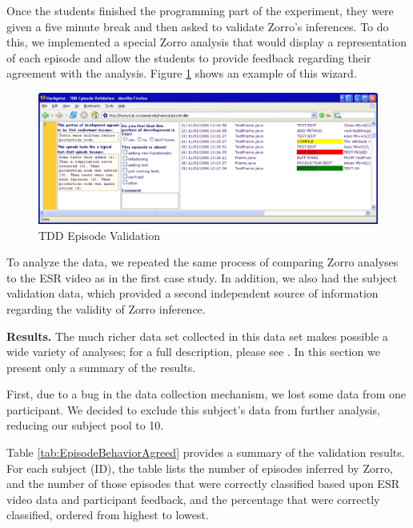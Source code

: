 \documentclass[smallextended]{svjour3}     %
\begin{document}
Once the students finished the programming part of the experiment, they
were given a five minute break and then asked to validate Zorro's
inferences.  To do this, we implemented a special Zorro analysis that would
display a representation of each episode and allow the students to provide
feedback regarding their agreement with the analysis.  Figure
\ref{fig:EpisodeFeedback} shows an example of this wizard.

\begin{figure}[htbp]
  \centering
  \includegraphics[width=1.0\textwidth]{EpisodeFeedback}
  \caption{TDD Episode Validation}\label{fig:EpisodeFeedback}
\end{figure}

To analyze the data, we repeated the same process of comparing Zorro analyses to the ESR video as in the first case study.  In addition, we also had the subject validation data, which provided a second independent source of information regarding the validity of Zorro inference.  

{\bf Results.}  The much richer data set collected in this data set makes possible a wide variety of analyses; for a full description, please see \cite{csdl2-07-04}.  In this section we present only a summary of the results. 

First, due to a bug in the data collection mechanism, we lost some data
from one participant. We decided to exclude this subject's data from further analysis, reducing our subject pool to 10. 


Table \ref{tab:EpisodeBehaviorAgreed} provides a summary of the validation results. For each subject (ID), the table lists the number of episodes inferred by Zorro, and the number of those episodes that were correctly classified based upon ESR video data and participant feedback, and the percentage that were correctly classified, ordered from highest to lowest.
\end{document}

